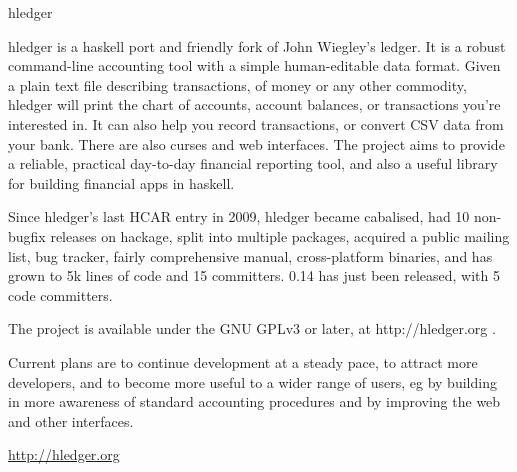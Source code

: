 \documentclass{scrreprt}
\begin{document}
\begin{hcarentry}{hledger}
\participants{}%
\makeheader

hledger is a haskell port and friendly fork of John Wiegley's ledger.  It
is a robust command-line accounting tool with a simple human-editable data
format. Given a plain text file describing transactions, of money or any
other commodity, hledger will print the chart of accounts, account
balances, or transactions you're interested in.  It can also help you
record transactions, or convert CSV data from your bank. There are also
curses and web interfaces. The project aims to provide a reliable,
practical day-to-day financial reporting tool, and also a useful library
for building financial apps in haskell.

Since hledger's last HCAR entry in 2009, hledger became cabalised, had 10
non-bugfix releases on hackage, split into multiple packages, acquired a
public mailing list, bug tracker, fairly comprehensive manual,
cross-platform binaries, and has grown to 5k lines of code and 15
committers. 0.14 has just been released, with 5 code committers.

The project is available under the GNU GPLv3 or later, at http://hledger.org .

Current plans are to continue development at a steady pace, to attract
more developers, and to become more useful to a wider range of users, eg
by building in more awareness of standard accounting procedures and by
improving the web and other interfaces.

\FurtherReading
  \url{http://hledger.org}
\end{hcarentry}
\end{document}
